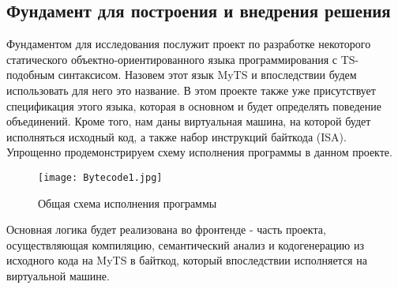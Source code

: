 \subsection{Фундамент для построения и внедрения решения}

Фундаментом для исследования послужит проект по разработке некоторого статического объектно-ориентированного языка
программирования с TS-подобным синтаксисом.
Назовем этот язык MyTS и впоследствии будем использовать для него это название.
В этом проекте также уже присутствует спецификация этого языка, которая в основном и будет определять поведение
объединений.
Кроме того, нам даны виртуальная машина, на которой будет исполняться исходный код, а также набор инструкций байткода (ISA).
Упрощенно продемонстрируем схему исполнения программы в данном проекте.

\begin{figure}[h]
    \centering
    \texttt{[image: Bytecode1.jpg]}
    \caption{Общая схема исполнения программы}\label{fig:figure}
\end{figure}

Основная логика будет реализована во фронтенде - часть проекта, осуществляющая компиляцию, семантический анализ и
кодогенерацию из исходного кода на MyTS в байткод, который впоследствии исполняется на виртуальной машине.

\newpage
